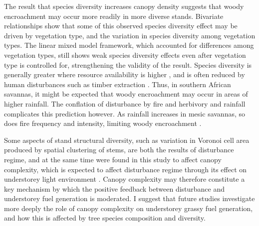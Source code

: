\documentclass[11pt,a4paper]{article}
\begin{document}
The result that species diversity increases canopy density suggests that woody encroachment may occur more readily in more diverse stands. Bivariate relationships show that some of this observed species diversity effect may be driven by vegetation type, and the variation in species diversity among vegetation types. The linear mixed model framework, which accounted for differences among vegetation types, still shows weak species diversity effects even after vegetation type is controlled for, strengthening the validity of the result. Species diversity is generally greater where resource availability is higher \citep{}, and is often reduced by human disturbances such as timber extraction \citep{}. Thus, in southern African savannas, it might be expected that woody encroachment may occur in areas of higher rainfall. The conflation of disturbance by fire and herbivory and rainfall complicates this prediction however. As rainfall increases in mesic savannas, so does fire frequency and intensity, limiting woody encroachment \citep{}.

Some aspects of stand structural diversity, such as variation in Voronoi cell area produced by spatial clustering of stems, are both the results of disturbance regime, and at the same time were found in this study to affect canopy complexity, which is expected to affect disturbance regime through its effect on understorey light environment \citep{}. Canopy complexity may therefore constitute a key mechanism by which the positive feedback between disturbance and understorey fuel generation is moderated. I suggest that future studies investigate more deeply the role of canopy complexity on understorey grassy fuel generation, and how this is affected by tree species composition and diversity.
\end{document}
